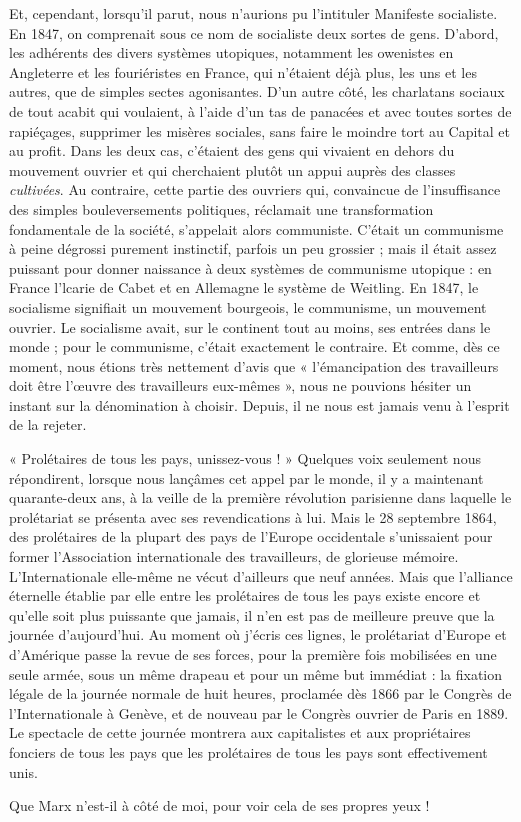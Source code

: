\documentclass[french,twoside]{book} %
\begin{document}
Et, cependant, lorsqu’il parut, nous n’aurions pu l’intituler Manifeste socialiste. En 1847, on comprenait sous ce nom de socialiste deux sortes de gens. D'abord, les adhérents des divers systèmes utopiques, notamment les owenistes en Angleterre et les fouriéristes en France, qui n’étaient déjà plus, les uns et les autres, que de simples sectes agonisantes. D'un autre côté, les charlatans sociaux de tout acabit qui voulaient, à l’aide d’un tas de panacées et avec toutes sortes de rapiéçages, supprimer les misères sociales, sans faire le moindre tort au Capital et au profit. Dans les deux cas, c’étaient des gens qui vivaient en dehors du mouvement ouvrier et qui cherchaient plutôt un appui auprès des classes \emph{cultivées}. Au contraire, cette partie des ouvriers qui, convaincue de l’insuffisance des simples bouleversements politiques, réclamait une transformation fondamentale de la société, s’appelait alors communiste. C'était un communisme à peine dégrossi purement instinctif, parfois un peu grossier ; mais il était assez puissant pour donner naissance à deux systèmes de communisme utopique : en France l’lcarie de Cabet et en Allemagne le système de Weitling. En 1847, le socialisme signifiait un mouvement bourgeois, le communisme, un mouvement ouvrier. Le socialisme avait, sur le continent tout au moins, ses entrées dans le monde ; pour le communisme, c’était exactement le contraire. Et comme, dès ce moment, nous étions très nettement d’avis que « l’émancipation des travailleurs doit être l’œuvre des travailleurs eux-mêmes », nous ne pouvions hésiter un instant sur la dénomination à choisir. Depuis, il ne nous est jamais venu à l’esprit de la rejeter.\par
« Prolétaires de tous les pays, unissez-vous ! » Quelques voix seulement nous répondirent, lorsque nous lançâmes cet appel par le monde, il y a maintenant quarante-deux ans, à la veille de la première révolution parisienne dans laquelle le prolétariat se présenta avec ses revendications à lui. Mais le 28 septembre 1864, des prolétaires de la plupart des pays de l’Europe occidentale s’unissaient pour former l’Association internationale des travailleurs, de glorieuse mémoire. L'Internationale elle-même ne vécut d’ailleurs que neuf années. Mais que l’alliance éternelle établie par elle entre les prolétaires de tous les pays existe encore et qu’elle soit plus puissante que jamais, il n’en est pas de meilleure preuve que la journée d’aujourd’hui. Au moment où j’écris ces lignes, le prolétariat d’Europe et d’Amérique passe la revue de ses forces, pour la première fois mobilisées en une seule armée, sous un même drapeau et pour un même but immédiat : la fixation légale de la journée normale de huit heures, proclamée dès 1866 par le Congrès de l’Internationale à Genève, et de nouveau par le Congrès ouvrier de Paris en 1889. Le spectacle de cette journée montrera aux capitalistes et aux propriétaires fonciers de tous les pays que les prolétaires de tous les pays sont effectivement unis.\par
Que Marx n’est-il à côté de moi, pour voir cela de ses propres yeux !\par
\end{document}
